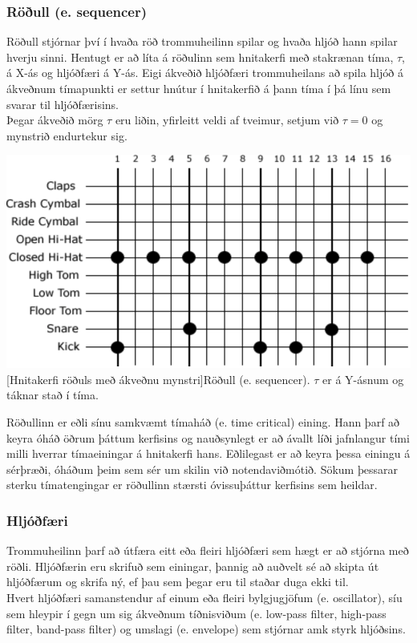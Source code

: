 \documentclass[a4paper,11pt,twocolumn]{article}
\newenvironment{Figure}
  {\par\medskip\noindent\minipage{\linewidth}}
  {\endminipage\par\medskip}
\begin{document}
\subsubsection{Röðull (e. sequencer)}
Röðull stjórnar því í hvaða röð trommuheilinn spilar og hvaða hljóð hann spilar hverju sinni. Hentugt er að líta á röðulinn sem hnitakerfi með stakrænan tíma, $\tau$, á X-ás og hljóðfæri á Y-ás. Eigi ákveðið hljóðfæri trommuheilans að spila hljóð á ákveðnum tímapunkti er settur hnútur í hnitakerfið á þann tíma í þá línu sem svarar til hljóðfærisins.\\
\indent Þegar ákveðið mörg $\tau$ eru liðin, yfirleitt veldi af tveimur, setjum við $\tau = 0$ og mynstrið endurtekur sig.

\begin{Figure}
	\centering
 	\includegraphics[width=0.5\linewidth]{seq.png}
	[Hnitakerfi röðuls með ákveðnu mynstri]{Röðull (e. sequencer). $\tau$ er á Y-ásnum og táknar stað í tíma.}
\end{Figure}

\noindent
Röðullinn er eðli sínu samkvæmt tímaháð (e. time critical) eining. Hann þarf að keyra óháð öðrum þáttum kerfisins og nauðsynlegt er að ávallt líði jafnlangur tími milli hverrar tímaeiningar á hnitakerfi hans. Eðlilegast er að keyra þessa einingu á sérþræði, óháðum þeim sem sér um skilin við notendaviðmótið. Sökum þessarar sterku tímatengingar er röðullinn stærsti óvissuþáttur kerfisins sem heildar.
\subsubsection{Hljóðfæri}
Trommuheilinn þarf að útfæra eitt eða fleiri hljóðfæri sem hægt er að stjórna með röðli. Hljóðfærin eru skrifuð sem einingar, þannig að auðvelt sé að skipta út hljóðfærum og skrifa ný, ef þau sem þegar eru til staðar duga ekki til.\\
\indent Hvert hljóðfæri samanstendur af einum eða fleiri bylgjugjöfum (e. oscillator), síu sem hleypir í gegn um sig ákveðnum tíðnisviðum (e. low-pass filter\cite{lpf}, high-pass filter, band-pass filter) og umslagi\cite{envelope} (e. envelope) sem stjórnar amk styrk hljóðsins.
\end{document}
